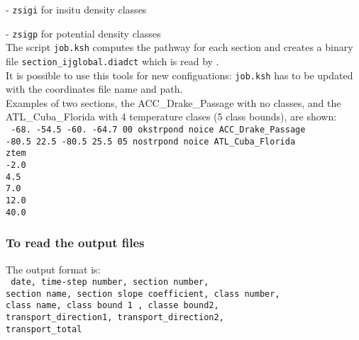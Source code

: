 \documentclass[../main/NEMO_manual]{subfiles}
\begin{document}
 - \texttt{zsigi} for    insitu density classes

 - \texttt{zsigp} for potential density classes \\

 The script \texttt{job.ksh} computes the pathway for each section and creates a binary file
 \texttt{section\_ijglobal.diadct} which is read by \NEMO. \\

 It is possible to use this tools for new configuations: \texttt{job.ksh} has to be updated with
 the coordinates file name and path. \\

 Examples of two sections, the ACC\_Drake\_Passage with no classes,
 and the ATL\_Cuba\_Florida with 4 temperature clases (5 class bounds), are shown: \\
 \noindent
 {
   \texttt{
     -68.    -54.5   -60.    -64.7  00 okstrpond noice ACC\_Drake\_Passage \\
     -80.5    22.5   -80.5    25.5  05 nostrpond noice ATL\_Cuba\_Florida  \\
     ztem                                                                  \\
     -2.0                                                                  \\
     4.5                                                                  \\
     7.0                                                                  \\
     12.0                                                                  \\
     40.0}
 }

\subsubsection{To read the output files}

The output format is: \\
{
  \texttt{
    date, time-step number, section number,                \\
    section name, section slope coefficient, class number, \\
    class name, class bound 1 , classe bound2,             \\
    transport\_direction1, transport\_direction2,          \\
    transport\_total}
}                                     \\
\end{document}
